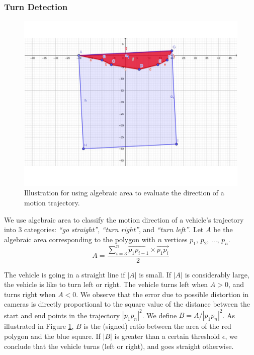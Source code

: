 \subsubsection{Turn Detection}
\begin{figure}[!htb]
    \centering
    \includegraphics[width=\linewidth]{resources/images/methods/SignedArea_foxit.pdf}
    \caption{Illustration for using algebraic area to evaluate the direction of a motion trajectory.}
    \label{fig:signed_area}
\end{figure}
We use algebraic area to classify the motion direction of a vehicle's trajectory into 3 categories:  \emph{``go straight''},  \emph{``turn right''}, and \emph{``turn left''}. 
Let $A$ be the algebraic area corresponding to the polygon with $n$ vertices $p_1$, $p_2$, ..., $p_n$. 
\[
A = \frac{{\sum\nolimits_{i = 3}^n {\overrightarrow {p_1 p_{i - 1} }  \times \overrightarrow {p_1 p_i } } }}{2}
\]

The vehicle is going in a straight line if $|A|$ is small. If $|A|$ is considerably large, the vehicle is like to turn left or right. The vehicle turns left when $A > 0$, and turns right when $A < 0$.
We observe that the error due to possible distortion in cameras is directly proportional to the square value of the distance between the start and end points in the trajectory $|p_1p_n|^2$.
We define $B = A/|p_1p_n|^2$. As illustrated in Figure \ref{fig:signed_area}, $B$ is the (signed) ratio between the area of the red polygon and the blue square. If $|B|$ is greater than a certain threshold $\epsilon$, we conclude that the vehicle turns (left or right), and goes straight otherwise.
